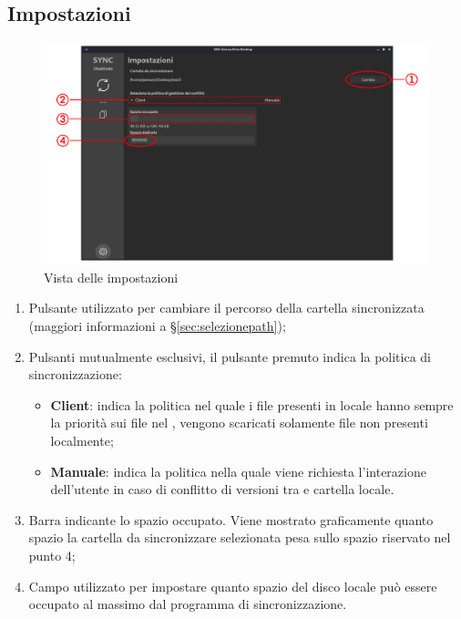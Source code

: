 \subsection{Impostazioni} \label{sec:impostazioni}
\begin{figure}[H]
    \centering
    \includegraphics[scale = 0.30]{components/img/settings.png}
    \caption{Vista delle impostazioni}
    \label{fig:Vista delle impostazioni}
\end{figure}
\begin{enumerate}
	\item Pulsante utilizzato per cambiare il percorso della cartella sincronizzata (maggiori informazioni a \S{}\ref{sec:selezionepath});
	\item Pulsanti mutualmente esclusivi, il pulsante premuto indica la politica di sincronizzazione:
	\begin{itemize}
		\item \textbf{Client}: indica la politica nel quale i file presenti in locale hanno sempre la priorità sui file nel , vengono scaricati solamente file non presenti localmente;
		\item \textbf{Manuale}: indica la politica nella quale  viene richiesta l'interazione dell'utente in caso di conflitto di versioni tra  e cartella locale.
	\end{itemize}
	\item Barra indicante lo spazio occupato. Viene mostrato graficamente quanto spazio la cartella da sincronizzare selezionata pesa sullo spazio riservato nel punto 4;
	\item Campo utilizzato per impostare quanto spazio del disco locale può essere occupato al massimo dal programma di sincronizzazione.
\end{enumerate}